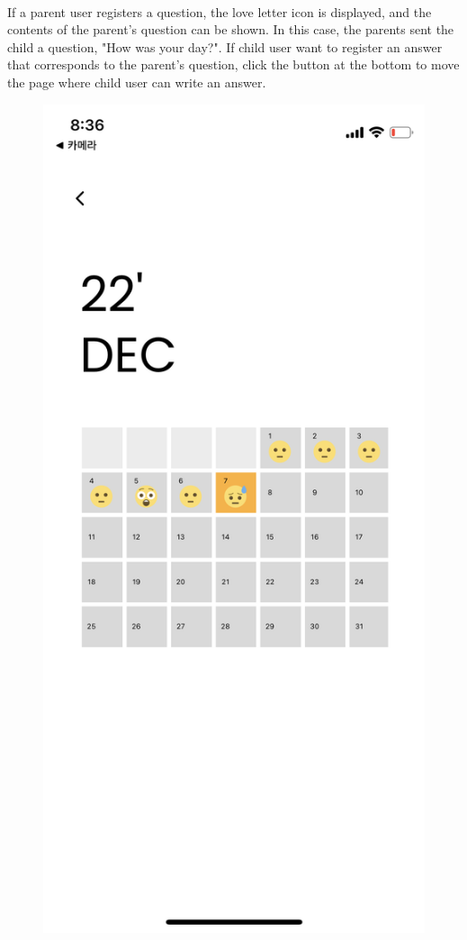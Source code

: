 \documentclass[conference]{IEEEtran}
\begin{document}
\begin{enumerate}
\begin{enumerate}
        \\If a parent user registers a question, the love letter icon is displayed, and the contents of the parent's question can be shown. In this case, the parents sent the child a question, "How was your day?". If child user want to register an answer that corresponds to the parent’s question, click the button at the bottom to move the page where child user can write an answer.
        \begin{figure}[H]
         \centering
         \includegraphics[scale=0.1]{UseCases/5.calendar.png}

\end{figure}
\end{enumerate}
\end{enumerate}
\end{document}

